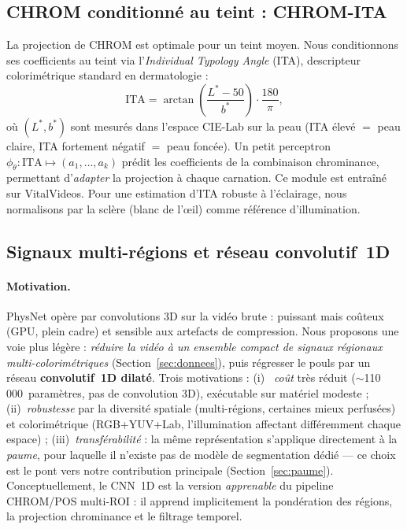 \documentclass[11pt]{article}
\begin{document}
\subsection{CHROM conditionné au teint : CHROM-ITA}
\label{sec:chromita}
La projection de CHROM est optimale pour un teint \og{}moyen\fg{}. Nous conditionnons ses
coefficients au teint via l'\emph{Individual Typology Angle} (ITA), descripteur
colorimétrique standard en dermatologie :
\begin{equation}
\mathrm{ITA} = \arctan\!\left(\frac{L^* - 50}{b^*}\right)\cdot\frac{180}{\pi},
\end{equation}
où $(L^*, b^*)$ sont mesurés dans l'espace CIE-Lab sur la peau (ITA élevé $=$ peau
claire, ITA fortement négatif $=$ peau foncée). Un petit perceptron
$\phi_\theta : \mathrm{ITA} \mapsto (a_1,\dots,a_k)$ prédit les coefficients de la
combinaison chrominance, permettant d'\emph{adapter} la projection à chaque
carnation. Ce module est entraîné sur VitalVideos. Pour une estimation d'ITA robuste
à l'éclairage, nous normalisons par la sclère (blanc de l'\oe{}il) comme référence
d'illumination.

\subsection{Signaux multi-régions et réseau convolutif~1D}
\label{sec:cnn1d}

\paragraph{Motivation.} PhysNet opère par convolutions 3D sur la vidéo brute :
puissant mais coûteux (GPU, plein cadre) et sensible aux artefacts de compression.
Nous proposons une voie plus légère : \emph{réduire la vidéo à un ensemble compact de
signaux régionaux multi-colorimétriques} (Section~\ref{sec:donnees}), puis régresser
le pouls par un réseau \textbf{convolutif~1D dilaté}. Trois motivations : (i)~\emph{
coût} très réduit ($\sim$110\,000~paramètres, pas de convolution 3D), exécutable sur
matériel modeste ; (ii)~\emph{robustesse} par la diversité spatiale (multi-régions,
certaines mieux perfusées) et colorimétrique (RGB+YUV+Lab, l'illumination affectant
différemment chaque espace) ; (iii)~\emph{transférabilité} : la même représentation
s'applique directement à la \emph{paume}, pour laquelle il n'existe pas de modèle de
segmentation dédié --- ce choix est le pont vers notre contribution principale
(Section~\ref{sec:paume}). Conceptuellement, le CNN~1D est la version \emph{apprenable}
du pipeline CHROM/POS multi-ROI : il apprend implicitement la pondération des régions,
la projection chrominance et le filtrage temporel.
\end{document}
